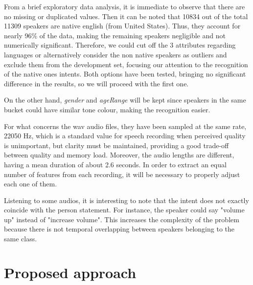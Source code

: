 \documentclass[conference]{IEEEtran}
\begin{document}
From a brief exploratory data analysis, it is immediate to observe that there are no missing or duplicated values. 
Then it can be noted that 10834 out of the total 11309 speakers are native english (from United States).
Thus, they account for nearly 96\% of the data, making the remaining speakers negligible and not numerically significant.
Therefore, we could cut off the 3 attributes regarding languages or alternatively consider the non native speakers as outliers and exclude them from the development set, focusing our attention to the recognition of the native ones intents.
Both options have been tested, bringing no significant difference in the results, so we will proceed with the first one.

On the other hand, \textit{gender} and \textit{ageRange} will be kept since speakers in the same bucket could have similar tone colour, making the recognition easier.

For what concerns the wav audio files, they have been sampled at the same rate, 22050 Hz, which is a standard value for speech recording when perceived quality is unimportant, but clarity must be maintained, providing a good trade-off between quality and memory load.
Moreover, the audio lengths are different, having a mean duration of about 2.6 seconds.
In order to extract an equal number of features from each recording, it will be necessary to properly adjust each one of them. 

Listening to some audios, it is interesting to note that the intent does not exactly coincide with the person statement.
For instance, the speaker could say "volume up" instead of "increase volume".
This increases the complexity of the problem because there is not temporal overlapping between speakers belonging to the same class.

\section{Proposed approach}
\end{document}
